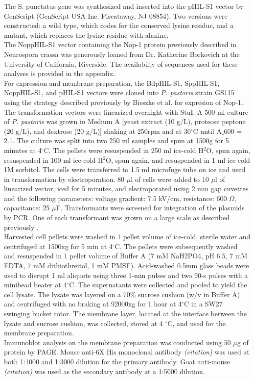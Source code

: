 \indent The S. punctatus gene was synthesized and inserted into the pHIL-S1 vector by GenScript (GenScript USA Inc. Piscataway, NJ 08854). Two versions were constructed: a wild type, which codes for the conserved lysine residue, and a mutant, which replaces the lysine residue with alanine.  \\
\indent The NoppHIL-S1 vector containing the Nop-1 protein previously described in Neurospora crassa \cite{Bieszke1999} was generously loaned from Dr. Katherine Borkovich at the University of California, Riverside. The availabilty of sequences used for these analyses is provided in the appendix.\\
\indent For expression and membrane preparation, the BdpHIL-S1, SppHIL-S1, NoppHIL-S1, and pHIL-S1 vectors were cloned into \textit{P. pastoris} strain GS115 using the strategy described previously by Bieszke et al. \nocite{Bieszke1999} for expresion of Nop-1. The transformation vectors were linearized overnight with StuI. A 500 ml culture of \textit{P. pastoris} was grown in Medium A [yeast extract (10 g/L), proteose peptone (20 g/L), and dextrose (20 g/L)] shaking at 250rpm and at 30$^{\circ}$C until A$\_{600}$ = 2.1. The culture was split into two 250 ml samples and spun at 1500g for 5 minutes at 4$^{\circ}$C. The pellets were resuspended in 250 ml ice-cold H$^{2}$O, spun again, resuspended in 100 ml ice-cold H$^{2}$O, spun again, and resuspended in 1 ml ice-cold 1M sorbitol. The cells were transferred to 1.5 ml microfuge tube on ice and used in transformation by electroporation. 80 $\mu$l of cells were added to 10 $\mu$l of linearized vector, iced for 5 minutes, and electroporated using 2 mm gap cuvettes and the following parameters: voltage gradient: 7.5 kV/cm, resistance: 600 $\Omega$, capacitance: 25 $\mu$F. Transformants were screened for integration of the plasmids by PCR. One of each transformant was grown on a large scale as described previously \cite{Bieszke1999}.\\
\indent Harvested cell pellets were washed in 1 pellet volume of ice-cold, sterile water and centrifuged at 1500xg for 5 min at 4$^{\circ}$C. The pellets were subsequently washed and resuspended in 1 pellet volume of Buffer A (7 mM NaH2PO4, pH 6.5, 7 mM EDTA, 7 mM dithiothreitol, 1 mM PMSF). Acid-washed 0.5mm glass beads were used to disrupt 1 ml aliquots using three 1-min pulses and two 90-s pulses with a minibead beater at 4$^{\circ}$C. The supernatants were collected and pooled to yield the cell lysate. The lysate was layered on a 70\% sucrose cushion (w/v in Buffer A) and centrifuged with no braking at 92000xg for 1 hour at 4$^{\circ}$C in a SW27 swinging bucket rotor.  The membrane layer, located at the interface between the lysate and sucrose cushion, was collected, stored at 4 $^{\circ}$C, and used for the membrane preparation.\\
\indent Immunoblot analysis on the membrane preparation was conducted using 50 $\mu$g of protein by PAGE. Mouse anti-6X His monoclonal antibody \emph{(citation)} was used at both 1:1000 and 1:3000 dilution for the primary antibody. Goat anti-mouse \emph{(citation)} was used as the secondary antibody at a 1:5000 dilution.\\
